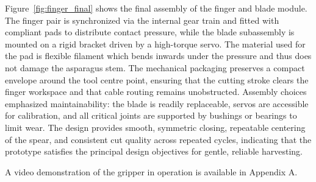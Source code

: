 Figure~\ref{fig:finger_final} shows the final assembly of the finger and blade module. The finger
pair is synchronized via the internal gear train and fitted with compliant pads to distribute
contact pressure, while the blade subassembly is mounted on a rigid bracket driven by a
high-torque servo. The material used for the pad is flexible filament which bends inwards under the pressure and thus does not damage the asparagus stem. The mechanical packaging preserves a compact envelope around the tool
centre point, ensuring that the cutting stroke clears the finger workspace and that cable
routing remains unobstructed. Assembly choices emphasized maintainability: the blade is
readily replaceable, servos are accessible for calibration, and all critical joints are supported by
bushings or bearings to limit wear. The design provides smooth, symmetric closing,
repeatable centering of the spear, and consistent cut quality across repeated cycles, indicating
that the prototype satisfies the principal design objectives for gentle, reliable harvesting.

A video demonstration of the gripper in operation is available in Appendix A.




